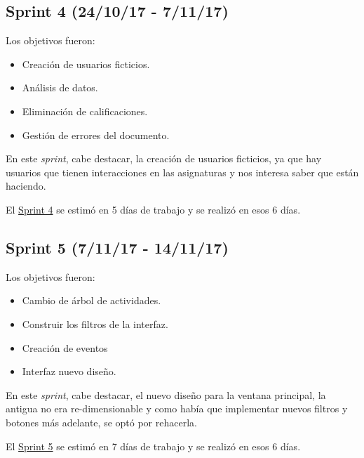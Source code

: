 
\subsection{Sprint 4 (24/10/17 -
	7/11/17)}\label{sprint-4-241017---071117}

Los objetivos fueron:
\begin{itemize}
	\tightlist
	\item
	Creación de usuarios ficticios.
	\item
	Análisis de datos.
	\item
	Eliminación de calificaciones.	
	\item
	Gestión de errores del documento.
	
\end{itemize}

En este \emph{sprint}, cabe destacar, la creación de usuarios ficticios, ya que hay usuarios que tienen interacciones en las asignaturas y nos interesa saber que están haciendo.

El \href{https://github.com/trona85/GII-17.1B-UBULog-1.0/milestone/4?closed=1}{Sprint 4} se estimó en 5 días de trabajo y se realizó en esos 6 días.


\subsection{Sprint 5 (7/11/17 -
	14/11/17)}\label{sprint-5-071117---141117}

Los objetivos fueron:
\begin{itemize}
	\tightlist
	\item
	Cambio de árbol de actividades.
	\item
	Construir los filtros de la interfaz.
	\item
	Creación de eventos	
	\item
	Interfaz nuevo diseño.
	
\end{itemize}

En este \emph{sprint}, cabe destacar, el nuevo diseño para la ventana principal, la antigua no era re-dimensionable y como había que implementar nuevos filtros y botones más adelante, se optó por rehacerla.

El \href{https://github.com/trona85/GII-17.1B-UBULog-1.0/milestone/5?closed=1}{Sprint 5} se estimó en 7 días de trabajo y se realizó en esos 6 días.

